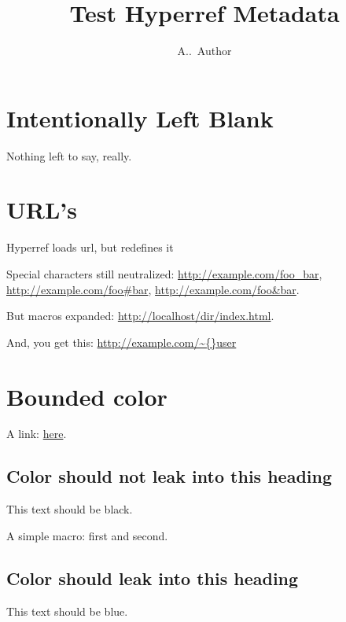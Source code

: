 \documentclass{article}
\title{Test Hyperref Metadata}
\author{A..~Author}
\begin{document}
\maketitle
\section{Intentionally Left Blank}
Nothing left to say, really.




\section{URL's}
Hyperref loads url, but redefines it

Special characters still neutralized:
 \url{http://example.com/foo_bar},
 \url{http://example.com/foo#bar},
 \url{http://example.com/foo&bar}.

\def\baz{index.html}
But macros expanded: \url{http://localhost/dir/\baz}.

And, you get this: \url{http://example.com/\~{}user}

\section{Bounded color}
A link: \href{https://example.com}{\color{blue}here}.

\subsection{Color should not leak into this heading}
This text should be black.

\def\simple#1#2{#1 and #2}
A simple macro: \simple{\color{blue}first}{second}.

\subsection{Color should leak into this heading}
This text should be blue.
\end{document}
